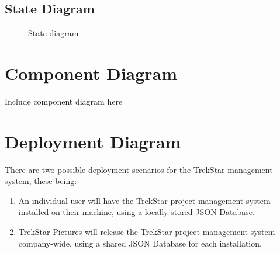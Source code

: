 \documentclass[
  english,
  a4paper,
,tablecaptionabove
]{scrartcl}
\providecommand{\tightlist}{%
  \setlength{\itemsep}{0pt}\setlength{\parskip}{0pt}}
\begin{document}
\newpage

\begin{landscape}

\pagestyle{empty}

\hypertarget{state-diagram}{%
\section{State Diagram}\label{state-diagram}}

\begin{figure}
    \caption{State diagram} \label{fig:state_diagram}
\end{figure}

\end{landscape}

\newpage

\hypertarget{component-diagram}{%
\section{Component Diagram}\label{component-diagram}}

Include component diagram here

\newpage

\hypertarget{deployment-diagram}{%
\section{Deployment Diagram}\label{deployment-diagram}}

There are two possible deployment scenarios for the TrekStar management
system, these being:

\begin{enumerate}
\def\labelenumi{\arabic{enumi}.}
\tightlist
\item
  An individual user will have the TrekStar project management system
  installed on their machine, using a locally stored JSON Database.
\item
  TrekStar Pictures will release the TrekStar project management system
  company-wide, using a shared JSON Database for each installation.
\end{enumerate}
\end{document}
